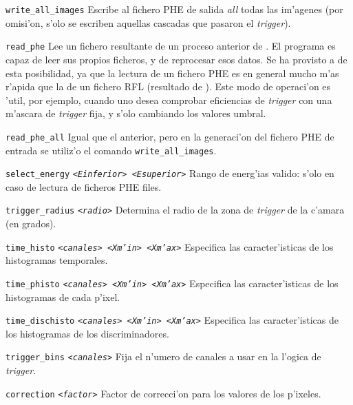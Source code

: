 \begin{Uentry}
\item[\texttt{write\_all\_images}]
%
  Escribe al fichero PHE de salida \emph{all} todas las im'agenes (por
  omisi'on, s'olo se escriben aquellas cascadas que pasaron el
  \emph{trigger}).

\item[\texttt{read\_phe}]
%
  Lee un fichero resultante de un proceso anterior de \camera.  El
  programa \camera es capaz de leer sus propios ficheros, y de
  reprocesar esos datos.  Se ha provisto a \camera de esta
  posibilidad, ya que la lectura de un fichero PHE es en general mucho
  m'as r'apida que la de un fichero RFL (resultado de ).
  Este modo de operaci'on es 'util, por ejemplo, cuando uno desea
  comprobar eficiencias de \emph{trigger} con una m'ascara de
  \emph{trigger} fija, y s'olo cambiando los valores umbral.

\item[\texttt{read\_phe\_all}]
%
  Igual que el anterior, pero en la generaci'on del fichero PHE de
  entrada se utiliz'o el comando \texttt{write\_all\_images}.

\item[\texttt{select\_energy} \quad
  \texttt{<\emph{Einferior}>  <\emph{Esuperior}>}]
%
  Rango de energ'ias valido: s'olo en caso de lectura de ficheros PHE
  files.

\item[\texttt{trigger\_radius} \quad
  \texttt{<\emph{radio}>}]
%
  Determina el radio de la zona de \emph{trigger} de la c'amara (en
  grados).

\item[\texttt{time\_histo} \quad
  \texttt{<\emph{canales}>  <\emph{Xm'in}>  <\emph{Xm'ax}>}]
%
  Especifica las caracter'isticas de los histogramas temporales.

\item[\texttt{time\_phisto} \quad
  \texttt{<\emph{canales}>  <\emph{Xm'in}>  <\emph{Xm'ax}>}]
%
  Especifica las caracter'isticas de los histogramas de cada p'ixel.

\item[\texttt{time\_dischisto} \quad
  \texttt{<\emph{canales}>  <\emph{Xm'in}>  <\emph{Xm'ax}>}]
%
  Especifica las caracter'isticas de los histogramas de los discriminadores.

\item[\texttt{trigger\_bins} \quad
  \texttt{<\emph{canales}>}]
%
  Fija el n'umero de canales a usar en la l'ogica de \emph{trigger}.

\item[\texttt{correction} \quad
  \texttt{<\emph{factor}>}]
%
  Factor de correcci'on para los valores de los p'ixeles.


\end{Uentry}
